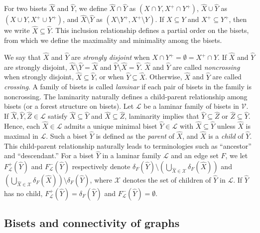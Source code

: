 \documentclass{article}
\newcommand{\Vfam}{\mathcal{V}}
\newcommand{\Lfam}{\mathcal{L}}
\begin{document}
For two bisets $\hat{X}$ and $\hat{Y}$, we define $\hat{X} \cap \hat{Y}$ as $(X\cap Y, X^+ \cap
Y^+)$, $\hat{X} \cup \hat{Y}$ as $(X \cup Y, X^+ \cup Y^+)$, and $\hat{X} \setminus \hat{Y}$ as 
$(X \setminus Y^+, X^+ \setminus Y)$. 
If $X \subseteq Y$ and $X^+ \subseteq Y^+$, then we write $\hat{X} \subseteq \hat{Y}$. 
This inclusion relationship defines a partial order on the bisets, from which
we define the maximality and minimality among the bisets.

We say that $\hat{X}$ and $\hat{Y}$ are 
\emph{strongly disjoint} when $X \cap Y^+ = \emptyset = X^+ \cap Y$.
 If $\hat{X}$ and $\hat{Y}$ are strongly disjoint, $\hat{X} \setminus \hat{Y} = \hat{X}$ and 
 $\hat{Y}\setminus \hat{X} = \hat{Y}$.
$\hat{X}$ and $\hat{Y}$ are called \emph{noncrossing} when strongly disjoint,
$\hat{X}\subseteq \hat{Y}$, 
or when $\hat{Y} \subseteq \hat{X}$.
Otherwise, $\hat{X}$ and $\hat{Y}$ are called \emph{crossing}.
A family of bisets is called \emph{laminar} if each pair of bisets in the family is noncrossing.
The laminarity naturally defines a child-parent relationship among bisets (or a forest structure on
bisets). Let $\Lfam$ be a laminar family of bisets in $\Vfam$. If $\hat{X}, \hat{Y}, \hat{Z} \in
\Lfam$ satisfy $\hat{X}\subseteq \hat{Y}$ and $\hat{X} \subseteq \hat{Z}$, laminarity implies
that $\hat{Y}\subseteq \hat{Z}$ or $\hat{Z}\subseteq\hat{Y}$. 
Hence, each $\hat{X} \in \Lfam$ admits a unique minimal biset $\hat{Y} \in \Lfam$ with $\hat{X}
\subseteq \hat{Y}$
unless $\hat{X}$ is maximal in $\Lfam$. Such a biset $\hat{Y}$ is defined as the \emph{parent} of 
$\hat{X}$, and $\hat{X}$ is a \emph{child} of 
$\hat{Y}$. This child-parent relationship
naturally leads to terminologies such as ``ancestor'' and ``descendant.'' 
For a biset $\hat{Y}$ in a laminar family $\Lfam$ and an edge set $F$, 
we let $F^+_{\Lfam}(\hat{Y})$ 
and $F^-_{\Lfam}(\hat{Y})$ 
 respectively denote 
$\delta_F(\hat{Y}) \setminus (\bigcup_{\hat{X} \in \mathcal{X}}\delta_F(\hat{X}))$
and 
$(\bigcup_{\hat{X} \in \mathcal{X}}\delta_F(\hat{X}))\setminus \delta_F(\hat{Y})$, where $\mathcal{X}$
denotes the set of children of $\hat{Y}$ in $\Lfam$.
If $\hat{Y}$ has no child, 
$F^+_{\Lfam}(\hat{Y})=\delta_F(\hat{Y})$ and
$F^-_{\Lfam}(\hat{Y})=\emptyset$.


\subsection{Bisets and connectivity of graphs}
\end{document}
